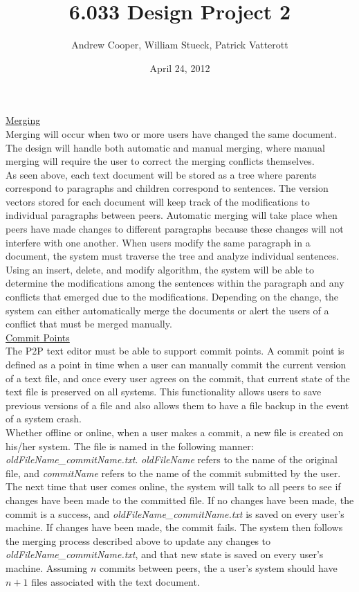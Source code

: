 \documentclass{6033dp1/6033dp1}
\title{6.033 Design Project 2}
\author{Andrew Cooper, William Stueck, Patrick Vatterott}
\date{April 24, 2012}
\begin{document}
\maketitle

\underline{Merging}
\vspace{12 pt} \\
Merging will occur when two or more users have changed the same document. The design will handle both automatic and manual merging, where manual merging will require the user to correct the merging conflicts themselves.
\vspace{12 pt} \\
As seen above, each text document will be stored as a tree where parents correspond to paragraphs and children correspond to sentences. The version vectors stored for each document will keep track of the modifications to individual paragraphs between peers. Automatic merging will take place when peers have made changes to different paragraphs because these changes will not interfere with one another. When users modify the same paragraph in a document, the system must traverse the tree and analyze individual sentences. Using an insert, delete, and modify algorithm, the system will be able to determine the modifications among the sentences within the paragraph and any conflicts that emerged due to the modifications. Depending on the change, the system can either automatically merge the documents or alert the users of a conflict that must be merged manually.
\vspace{12 pt} \\
\underline{Commit Points}
\vspace{12 pt} \\
The P2P text editor must be able to support commit points. A commit point is defined as a point in time when a user can manually commit the current version of a text file, and once every user agrees on the commit, that current state of the text file is preserved on all systems.  This functionality allows users to save previous versions of a file and also allows them to have a file backup in the event of a system crash.
\vspace{12 pt} \\
Whether offline or online, when a user makes a commit, a new file is created on his/her system. The file is named in the following manner: \emph{oldFileName\_commitName.txt}. \emph{oldFileName} refers to the name of the original file, and \emph{commitName} refers to the name of the commit submitted by the user. The next time that user comes online, the system will talk to all peers to see if changes have been made to the committed file. If no changes have been made, the commit is a success, and \emph{oldFileName\_commitName.txt} is saved on every user's machine. If changes have been made, the commit fails. The system then follows the merging process described above to update any changes to \emph{oldFileName\_commitName.txt}, and that new state is saved on every user's machine. Assuming $n$ commits between peers, the a user's system should have $n+1$ files associated with the text document.
\vspace{12 pt} \\
\end{document}
